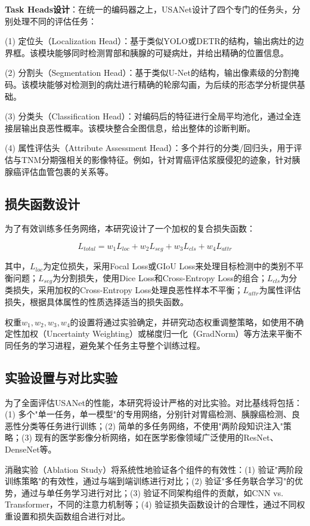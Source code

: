 \textbf{Task Heads设计}：在统一的编码器之上，USANet设计了四个专门的任务头，分别处理不同的评估任务：

(1) 定位头（Localization Head）：基于类似YOLO或DETR的结构，输出病灶的边界框。该模块能够同时检测胃部和胰腺的可疑病灶，并给出精确的位置信息。

(2) 分割头（Segmentation Head）：基于类似U-Net的结构，输出像素级的分割掩码。该模块能够对检测到的病灶进行精确的轮廓勾画，为后续的形态学分析提供基础。

(3) 分类头（Classification Head）：对编码后的特征进行全局平均池化，通过全连接层输出良恶性概率。该模块整合全图信息，给出整体的诊断判断。

(4) 属性评估头（Attribute Assessment Head）：多个并行的分类/回归头，用于评估与TNM分期强相关的影像特征。例如，针对胃癌评估浆膜侵犯的迹象，针对胰腺癌评估血管包裹的关系等。

\subsection{损失函数设计}

为了有效训练多任务网络，本研究设计了一个加权的复合损失函数：

$$L_{total} = w_1 L_{loc} + w_2 L_{seg} + w_3 L_{cls} + w_4 L_{attr}$$

其中，$L_{loc}$为定位损失，采用Focal Loss或GIoU Loss来处理目标检测中的类别不平衡问题；$L_{seg}$为分割损失，使用Dice Loss和Cross-Entropy Loss的组合；$L_{cls}$为分类损失，采用加权的Cross-Entropy Loss处理良恶性样本不平衡；$L_{attr}$为属性评估损失，根据具体属性的性质选择适当的损失函数。

权重$w_1, w_2, w_3, w_4$的设置将通过实验确定，并研究动态权重调整策略，如使用不确定性加权（Uncertainty Weighting）或梯度归一化（GradNorm）等方法来平衡不同任务的学习进程，避免某个任务主导整个训练过程。

\subsection{实验设置与对比实验}

为了全面评估USANet的性能，本研究将设计严格的对比实验。对比基线将包括：(1) 多个"单一任务，单一模型"的专用网络，分别针对胃癌检测、胰腺癌检测、良恶性分类等任务进行训练；(2) 简单的多任务网络，不使用"两阶段知识注入"策略；(3) 现有的医学影像分析网络，如在医学影像领域广泛使用的ResNet、DenseNet等。

消融实验（Ablation Study）将系统性地验证各个组件的有效性：(1) 验证"两阶段训练策略"的有效性，通过与端到端训练进行对比；(2) 验证"多任务联合学习"的优势，通过与单任务学习进行对比；(3) 验证不同架构组件的贡献，如CNN vs. Transformer，不同的注意力机制等；(4) 验证损失函数设计的合理性，通过不同权重设置和损失函数组合进行对比。

